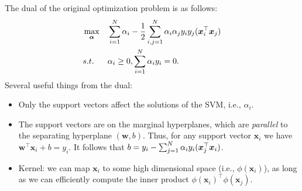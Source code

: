         The dual of the original optimization problem is as follows:
            \begin{equation}
                \begin{aligned}
                    & \max_{\bm{\alpha}} & & \sum_{i=1}^{N}{\alpha_i} - \frac{1}{2}\sum_{i,j=1}^{N}{\alpha_i \alpha_j y_i y_j (\bm{x}_i^\top \bm{x}_j) } \\
                    & s.t. & & \alpha_i \ge 0, \sum_{i=1}^{N}{\alpha_i y_i} = 0.
                \end{aligned}
            \end{equation}
        Several useful things from the dual:
        \begin{itemize}
            \item Only the support vectors  affect the solutions of the SVM, i.e., $\alpha_i$.
            \item The support vectors are on the marginal hyperplanes, which are \emph{parallel} to the separating hyperplane $(\bm{w}, b)$.
            Thus, for any support vector $\bm{x}_i$ we have $\bm{w}^\top \bm{x}_i + b = y_i$.
            It follows that $b = y_i - \sum_{j=1}^{N}{\alpha_i y_i (\bm{x}_j^\top \bm{x}_i) }$.
            \item Kernel: we can map $\bm{x}_i$ to some high dimensional space (i.e., $\phi(\bm{x}_i)$), as long as we can efficiently compute the inner product $\phi(\bm{x}_i)^\top \phi(\bm{x}_j)$.
        \end{itemize}

